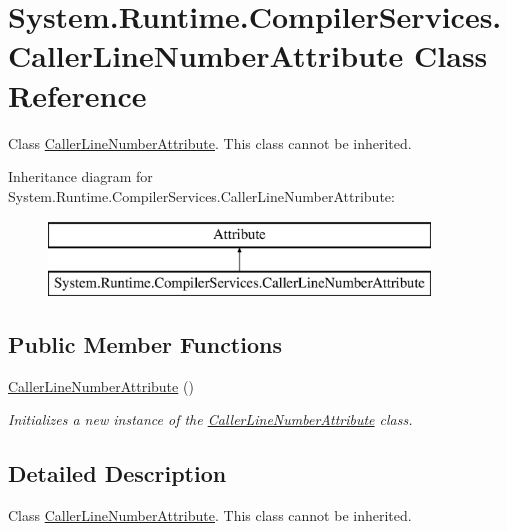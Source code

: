 \hypertarget{class_system_1_1_runtime_1_1_compiler_services_1_1_caller_line_number_attribute}{}\section{System.\+Runtime.\+Compiler\+Services.\+Caller\+Line\+Number\+Attribute Class Reference}
\label{class_system_1_1_runtime_1_1_compiler_services_1_1_caller_line_number_attribute}


Class \hyperlink{class_system_1_1_runtime_1_1_compiler_services_1_1_caller_line_number_attribute}{Caller\+Line\+Number\+Attribute}. This class cannot be inherited.  


Inheritance diagram for System.\+Runtime.\+Compiler\+Services.\+Caller\+Line\+Number\+Attribute\+:\begin{figure}[H]
\begin{center}
\leavevmode
\includegraphics[height=2.000000cm]{class_system_1_1_runtime_1_1_compiler_services_1_1_caller_line_number_attribute}
\end{center}
\end{figure}
\subsection*{Public Member Functions}
\begin{DoxyCompactItemize}
\item 
\hyperlink{class_system_1_1_runtime_1_1_compiler_services_1_1_caller_line_number_attribute_ad0fc848bfebd180096a0dea769719703}{Caller\+Line\+Number\+Attribute} ()
\begin{DoxyCompactList}\small\item\em Initializes a new instance of the \hyperlink{class_system_1_1_runtime_1_1_compiler_services_1_1_caller_line_number_attribute}{Caller\+Line\+Number\+Attribute} class. \end{DoxyCompactList}\end{DoxyCompactItemize}


\subsection{Detailed Description}
Class \hyperlink{class_system_1_1_runtime_1_1_compiler_services_1_1_caller_line_number_attribute}{Caller\+Line\+Number\+Attribute}. This class cannot be inherited. 

